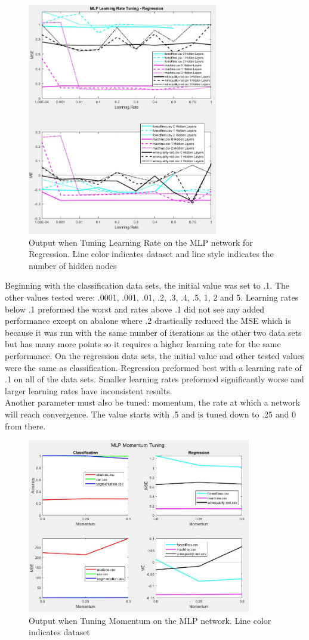\documentclass[twoside,11pt]{article}
\begin{document}
\begin{figure}[h]
	\centering
	\includegraphics[height=4in]{FINAL_FIGS/MLP_LR_TUNING_REG.JPG}
	\caption{Output when Tuning Learning Rate on the MLP network for Regression. Line color indicates dataset and line style indicates the number of hidden nodes}
\end{figure}
Beginning with the classification data sets, the initial value was set to .1. The other values tested were: .0001, .001, .01, .2, .3, .4, .5, 1, 2 and 5. Learning rates below .1 preformed the worst and rates above .1 did not see any added performance except on abalone where .2 drastically reduced the MSE which is because it was run with the same number of iterations as the other two data sets but has many more points so it requires a higher learning rate for the same performance.
On the regression data sets, the initial value and other tested values were the same as classification. Regression preformed best with a learning rate of .1 on all of the data sets. Smaller learning rates preformed significantly worse and larger learning rates have inconsistent results. \\
Another parameter must also be tuned: momentum, the rate at which a network will reach convergence. The value starts with .5 and is tuned down to .25 and 0 from there. \\
\begin{figure}[h]
	\centering
	\includegraphics[height=3in]{FINAL_FIGS/MLP_MOMENTUM.JPG}
	\caption{Output when Tuning Momentum on the MLP network. Line color indicates dataset}
\end{figure}
\end{document}
